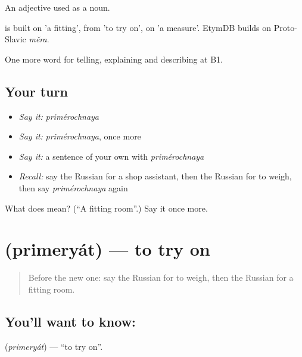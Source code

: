 An adjective used as a noun.

\begin{cousinweb}
\emph{} is built on \emph{} 'a fitting', from \emph{} 'to try on', on \emph{} 'a measure'. EtymDB builds \emph{} on Proto-Slavic \emph{měra}.
\end{cousinweb}

\begin{grammarlens}[title={What you've built}]
One more word for telling, explaining and describing at B1.
\end{grammarlens}

\subsection*{Your turn}
\begin{itemize}
\raggedright
  \item \emph{Say it:} \emph{primérochnaya}
  \item \emph{Say it:} \emph{primérochnaya}, once more
  \item \emph{Say it:} a sentence of your own with \emph{primérochnaya}
  \item \emph{Recall:} say the Russian for a shop assistant, then the Russian for to weigh, then say \emph{primérochnaya} again
\end{itemize}

\begin{tcolorbox}[breakable,colback=teal!4,colframe=teal!35!black,title={Before you move on}]
What does  mean? (\textquotedblleft{}A fitting room\textquotedblright{}.) Say it once more.
\end{tcolorbox}
\section[\texorpdfstring{\ru{примерять} (primeryát)}{примерять (primeryát)}]{ (primeryát) — to try on}

\label{lesson:RU-C453-primeryat}



\begin{quote}
Before the new one: say the Russian for to weigh, then the Russian for a fitting room.
\end{quote}

\subsection*{You'll want to know: }
\textbf{} (\emph{primeryát}) — \textquotedblleft{}to try on\textquotedblright{}.

